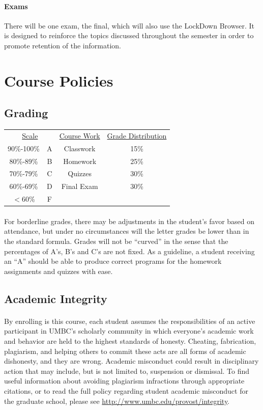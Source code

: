 \documentclass[letter,11pt]{article}
\begin{document}
\paragraph{Exams}There will be one exam, the final, which will also use the LockDown Browser. It is designed to reinforce the topics discussed throughout the semester in order to promote retention of the information.

\section*{Course Policies}
\subsection*{Grading}

\begin{center}
\begin{tabular}{ c c || c c}
\multicolumn{2}{c||}{\underline{Scale}} & \underline{Course Work} & \underline{Grade Distribution} \\
90\%-100\% & A & Classwork & 15\% \\
80\%-89\% & B & Homework & 25\% \\
70\%-79\% & C & Quizzes & 30\% \\ 
60\%-69\% & D & Final Exam & 30\% \\
$<$60\%     & F & 
\end{tabular}
\end{center}

\paragraph{}For borderline grades, there may be adjustments in the student's favor based on attendance, but under no circumstances will the letter grades be lower than in the standard formula. Grades will not be ``curved'' in the sense that the percentages of A's, B's and C's are not fixed. As a guideline, a student receiving an ``A'' should be able to produce correct programs for the homework assignments and quizzes with ease.

\subsection*{Academic Integrity}
\paragraph{}By enrolling is this course, each student assumes the responsibilities of an active participant in UMBC's scholarly community in which everyone's academic work and behavior are held to the highest standards of honesty. Cheating, fabrication, plagiarism, and helping others to commit these acts are all forms of academic dishonesty, and they are wrong. Academic misconduct could result in disciplinary action that may include, but is not limited to, suspension or dismissal. To find useful information about avoiding plagiarism infractions through appropriate citations, or to read the full policy regarding student academic misconduct for the graduate school, please see \url{http://www.umbc.edu/provost/integrity}.
\end{document}
